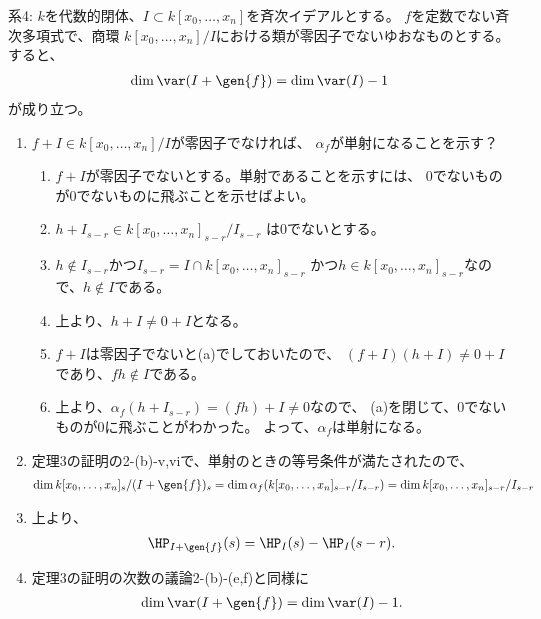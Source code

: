 \begin{framed}
  系4:
  $k$を代数的閉体、$I\subset k[x_0,\dots,x_n]$を斉次イデアルとする。
  $f$を定数でない斉次多項式で、商環
  $k[x_0,\dots,x_n]/I$における類が零因子でないゆおなものとする。
  すると、
  \begin{align}
    \dim \var(I+\gen{f}) = \dim \var(I) - 1
  \end{align}
  が成り立つ。
\end{framed}
\begin{myproof}
  \begin{enumerate}
    \item $f+I \in k[x_0,\dots,x_n]/I$が零因子でなければ、
    $\alpha_f$が単射になることを示す？
    \begin{enumerate}
      \item $f+I$が零因子でないとする。単射であることを示すには、
      0でないものが0でないものに飛ぶことを示せばよい。
      \item
      $h + I_{s-r} \in k[x_0,\dots,x_n]_{s-r}/I_{s-r}$
      は0でないとする。
      \item
      $h\notin I_{s-r}$かつ$I_{s-r} = I\cap k[x_0,\dots,x_n]_{s-r}$
      かつ$h \in k[x_0,\dots,x_n]_{s-r}$なので、$
      h\notin I$である。
      \item
      上より、$h + I \neq 0 + I$となる。
      \item
      $f+I$は零因子でないと(a)でしておいたので、
      $(f+I)(h+I) \neq 0 + I$であり、$fh\notin I$である。
      \item
      上より、$\alpha_f(h+I_{s-r}) = (fh) + I \neq 0$なので、
      (a)を閉じて、0でないものが0に飛ぶことがわかった。
      よって、$\alpha_f$は単射になる。
    \end{enumerate}
    \item
    定理3の証明の2-(b)-v,viで、単射のときの等号条件が満たされたので、
    \begin{align}
      \dim k[x_0,\dots,x_n]_s/(I+\gen{f})_s
      =
      \dim \alpha_f(k[x_0,\dots,x_n]_{s-r}/I_{s-r})
      =
      \dim k[x_0,\dots,x_n]_{s-r}/I_{s-r}
    \end{align}
    \item
    上より、
    \begin{align}
      \HP_{I+\gen{f}}(s) = \HP_I(s) - \HP_I(s-r).
    \end{align}
    \item
    定理3の証明の次数の議論2-(b)-(e,f)と同様に
    \begin{align}
      \dim \var(I+\gen{f}) = \dim \var(I) - 1.
    \end{align}
  \end{enumerate}
\end{myproof}


